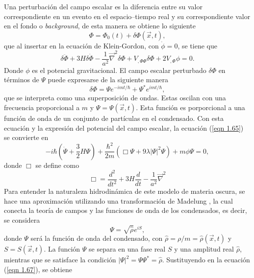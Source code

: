 \documentclass[a4paper,openright,10pt, oneside, final]{book}
\begin{document}
Una perturbación del campo escalar es la diferencia entre su valor correspondiente en un evento en el espacio--tiempo real y su correspondiente valor en el fondo o \textit{background}, de esta manera  se obtiene lo siguiente
\begin{equation}
\Phi = \Phi_{0}(t) + \delta\Phi(\vec{x},t),\label{eqn 1.64}
\end{equation}
que al insertar en la ecuación de Klein-Gordon, con $\dot{\phi}=0$, se tiene que
\begin{equation}
\delta\ddot{\Phi} + 3H\delta\dot{\Phi}
- \frac{1}{a^{2}}\vec{\nabla}^{2}\delta\Phi
+V_{,\Phi\Phi}\delta\Phi +2V_{,\Phi}\phi = 0.\label{eqn 1.65}
\end{equation}
Donde $\phi$ es el potencial gravitacional. El campo escalar perturbado $\delta\Phi$ en términos de $\Psi$ puede expresarse de la siguiente manera
\begin{equation}
\delta\Phi = \Psi e^{-imt/\hbar} +\Psi^{*}e^{imt/\hbar},\label{eqn 1.66}
\end{equation}
que se interpreta como una superposición de ondas. Estas oscilan con una frecuencia proporcional a $m$ y $\Psi = \Psi(\vec{x},t)$. Esta función es porporcional a una función de onda de un conjunto de partículas en el condensado. Con esta ecuación y la expresión del potencial del campo escalar, la ecuación (\ref{eqn 1.65}) se convierte en 
\begin{equation}
-i\hbar(\dot{\Psi}+\frac{3}{2}H\Psi) + \frac{\hbar^{2}}{2m}(\Box \Psi +9\lambda|\Psi|^{2}\Psi) + m\phi\Psi = 0,\label{eqn 1.67}
\end{equation}
donde $\Box$ se define como 
\begin{equation}
\Box = \frac{d^{2}}{d t^{2}} + 3H\frac{d}{d t} - \frac{1}{a^{2}}\vec{\nabla}^{2}\label{eqn 1.68}
\end{equation}
Para entender la naturaleza hidrodinámica de este modelo de materia oscura, se hace una aproximación utilizando una transformación de Madelung \cite{3.2, 3.3, 3.4}, la cual conecta la teoría de campos y las funciones de onda de los condensados, es decir, se considera 
\begin{equation}
\Psi=\sqrt{\hat{\rho}} e^{iS},\label{eqn 1.69}
\end{equation}
donde $\Psi$ será la función de onda del condensado, con $\hat{\rho}=\rho/m=\hat{\rho}(\vec{x},t)$ y $S=S(\vec{x},t)$. La función $\Psi$ se separa en una fase real $S$ y una amplitud real $\hat{\rho}$, mientras que se satisface la condición $|\Psi|^{2}=\Psi\Psi^{*}= \hat{\rho}$. Sustituyendo en la ecuación (\ref{eqn 1.67}), se obtiene
\end{document}
